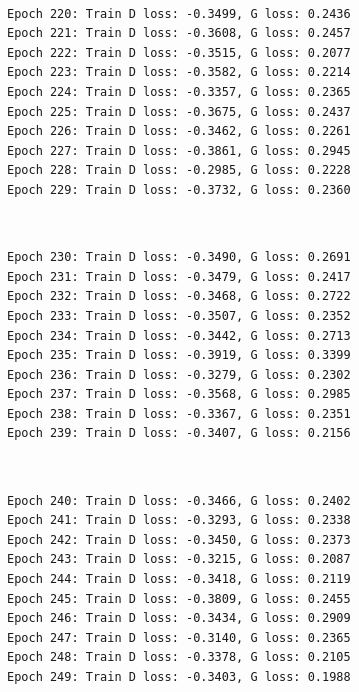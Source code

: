 \documentclass[11pt]{article}
\begin{document}
    \begin{center}
    \end{center}
    { \hspace*{\fill} \\}
    
    \begin{Verbatim}[commandchars=\\\{\}]
Epoch 220: Train D loss: -0.3499, G loss: 0.2436
Epoch 221: Train D loss: -0.3608, G loss: 0.2457
Epoch 222: Train D loss: -0.3515, G loss: 0.2077
Epoch 223: Train D loss: -0.3582, G loss: 0.2214
Epoch 224: Train D loss: -0.3357, G loss: 0.2365
Epoch 225: Train D loss: -0.3675, G loss: 0.2437
Epoch 226: Train D loss: -0.3462, G loss: 0.2261
Epoch 227: Train D loss: -0.3861, G loss: 0.2945
Epoch 228: Train D loss: -0.2985, G loss: 0.2228
Epoch 229: Train D loss: -0.3732, G loss: 0.2360

    \end{Verbatim}

    \begin{center}
    \end{center}
    { \hspace*{\fill} \\}
    
    \begin{Verbatim}[commandchars=\\\{\}]
Epoch 230: Train D loss: -0.3490, G loss: 0.2691
Epoch 231: Train D loss: -0.3479, G loss: 0.2417
Epoch 232: Train D loss: -0.3468, G loss: 0.2722
Epoch 233: Train D loss: -0.3507, G loss: 0.2352
Epoch 234: Train D loss: -0.3442, G loss: 0.2713
Epoch 235: Train D loss: -0.3919, G loss: 0.3399
Epoch 236: Train D loss: -0.3279, G loss: 0.2302
Epoch 237: Train D loss: -0.3568, G loss: 0.2985
Epoch 238: Train D loss: -0.3367, G loss: 0.2351
Epoch 239: Train D loss: -0.3407, G loss: 0.2156

    \end{Verbatim}

    \begin{center}
    \end{center}
    { \hspace*{\fill} \\}
    
    \begin{Verbatim}[commandchars=\\\{\}]
Epoch 240: Train D loss: -0.3466, G loss: 0.2402
Epoch 241: Train D loss: -0.3293, G loss: 0.2338
Epoch 242: Train D loss: -0.3450, G loss: 0.2373
Epoch 243: Train D loss: -0.3215, G loss: 0.2087
Epoch 244: Train D loss: -0.3418, G loss: 0.2119
Epoch 245: Train D loss: -0.3809, G loss: 0.2455
Epoch 246: Train D loss: -0.3434, G loss: 0.2909
Epoch 247: Train D loss: -0.3140, G loss: 0.2365
Epoch 248: Train D loss: -0.3378, G loss: 0.2105
Epoch 249: Train D loss: -0.3403, G loss: 0.1988

    \end{Verbatim}
\end{document}
